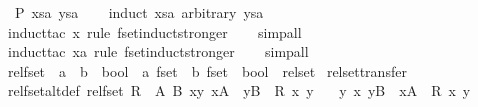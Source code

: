 \begin{isabellebody}
\ \ P\ xsa\ ysa{\isachardoublequoteclose}\isanewline
%
\isadelimproof
\ \ %
\endisadelimproof
%
\isatagproof
{}\isamarkupfalse%
\ {\isacharparenleft}induct\ xsa\ arbitrary{\isacharcolon}\ ysa{\isacharparenright}\isanewline
\ \ \isamarkupfalse%
\ {\isacharparenleft}induct{\isacharunderscore}tac\ x\ rule{\isacharcolon}\ fset{\isacharunderscore}induct{\isacharunderscore}stronger{\isacharparenright}\isanewline
\ \ \isamarkupfalse%
\ simp{\isacharunderscore}all\isanewline
\ \ \isamarkupfalse%
\ {\isacharparenleft}induct{\isacharunderscore}tac\ xa\ rule{\isacharcolon}\ fset{\isacharunderscore}induct{\isacharunderscore}stronger{\isacharparenright}\isanewline
\ \ \isamarkupfalse%
\ simp{\isacharunderscore}all\isanewline
\ \ \isamarkupfalse%
%
\endisatagproof
{\isafoldproof}%
%
\isadelimproof
%
\endisadelimproof
%
\isadelimdocument
%
\endisadelimdocument
%
\isatagdocument
%
\isamarkuptrue%
%
\isamarkuptrue%
%
\endisatagdocument
{\isafolddocument}%
%
\isadelimdocument
%
\endisadelimdocument
{}\isamarkupfalse%
\ rel{\isacharunderscore}fset\ {\isacharcolon}{\isacharcolon}\ {\isachardoublequoteopen}{\isacharparenleft}{\isacharprime}a\ {\isasymRightarrow}\ {\isacharprime}b\ {\isasymRightarrow}\ bool{\isacharparenright}\ {\isasymRightarrow}\ {\isacharprime}a\ fset\ {\isasymRightarrow}\ {\isacharprime}b\ fset\ {\isasymRightarrow}\ bool{\isachardoublequoteclose}\ \ rel{\isacharunderscore}set\isanewline
{}\ rel{\isacharunderscore}set{\isacharunderscore}transfer%
\isadelimproof
\ %
\endisadelimproof
%
\isatagproof
\isacommand{{\isachardot}}\isamarkupfalse%
%
\endisatagproof
{\isafoldproof}%
%
\isadelimproof
%
\endisadelimproof
\isanewline
\isanewline
{}\isamarkupfalse%
\ rel{\isacharunderscore}fset{\isacharunderscore}alt{\isacharunderscore}def{\isacharcolon}\ {\isachardoublequoteopen}rel{\isacharunderscore}fset\ R\ {\isacharequal}\ {\isacharparenleft}{\isasymlambda}A\ B{\isachardot}\ {\isacharparenleft}{\isasymforall}x{\isachardot}{\isasymexists}y{\isachardot}\ x{\isacharbar}{\isasymin}{\isacharbar}A\ {\isasymlongrightarrow}\ y{\isacharbar}{\isasymin}{\isacharbar}B\ {\isasymand}\ R\ x\ y{\isacharparenright}\isanewline
\ \ {\isasymand}\ {\isacharparenleft}{\isasymforall}y{\isachardot}\ {\isasymexists}x{\isachardot}\ y{\isacharbar}{\isasymin}{\isacharbar}B\ {\isasymlongrightarrow}\ x{\isacharbar}{\isasymin}{\isacharbar}A\ {\isasymand}\ R\ x\ y{\isacharparenright}{\isacharparenright}{\isachardoublequoteclose}\isanewline

\end{isabellebody}
